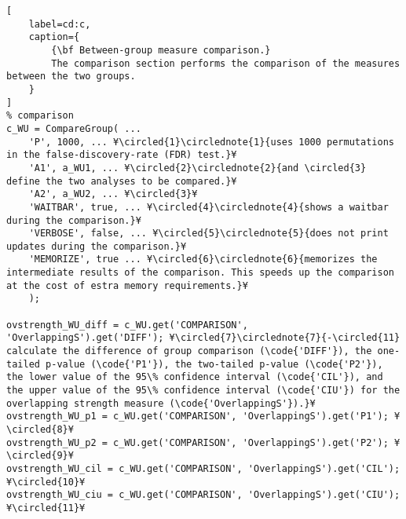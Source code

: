 \documentclass{tufte-handout}
\begin{document}
\begin{lstlisting}[
	label=cd:c,
	caption={
		{\bf Between-group measure comparison.}
		The comparison section performs the comparison of the measures between the two groups.
	}
]
% comparison
c_WU = CompareGroup( ...
    'P', 1000, ... ¥\circled{1}\circlednote{1}{uses 1000 permutations in the false-discovery-rate (FDR) test.}¥
    'A1', a_WU1, ... ¥\circled{2}\circlednote{2}{and \circled{3} define the two analyses to be compared.}¥
    'A2', a_WU2, ... ¥\circled{3}¥
    'WAITBAR', true, ... ¥\circled{4}\circlednote{4}{shows a waitbar during the comparison.}¥
    'VERBOSE', false, ... ¥\circled{5}\circlednote{5}{does not print updates during the comparison.}¥
    'MEMORIZE', true ... ¥\circled{6}\circlednote{6}{memorizes the intermediate results of the comparison. This speeds up the comparison at the cost of estra memory requirements.}¥
    );

ovstrength_WU_diff = c_WU.get('COMPARISON', 'OverlappingS').get('DIFF'); ¥\circled{7}\circlednote{7}{-\circled{11} calculate the difference of group comparison (\code{'DIFF'}), the one-tailed p-value (\code{'P1'}), the two-tailed p-value (\code{'P2'}), the lower value of the 95\% confidence interval (\code{'CIL'}), and the upper value of the 95\% confidence interval (\code{'CIU'}) for the overlapping strength measure (\code{'OverlappingS'}).}¥
ovstrength_WU_p1 = c_WU.get('COMPARISON', 'OverlappingS').get('P1'); ¥\circled{8}¥
ovstrength_WU_p2 = c_WU.get('COMPARISON', 'OverlappingS').get('P2'); ¥\circled{9}¥
ovstrength_WU_cil = c_WU.get('COMPARISON', 'OverlappingS').get('CIL'); ¥\circled{10}¥
ovstrength_WU_ciu = c_WU.get('COMPARISON', 'OverlappingS').get('CIU'); ¥\circled{11}¥
\end{lstlisting}
\end{document}

